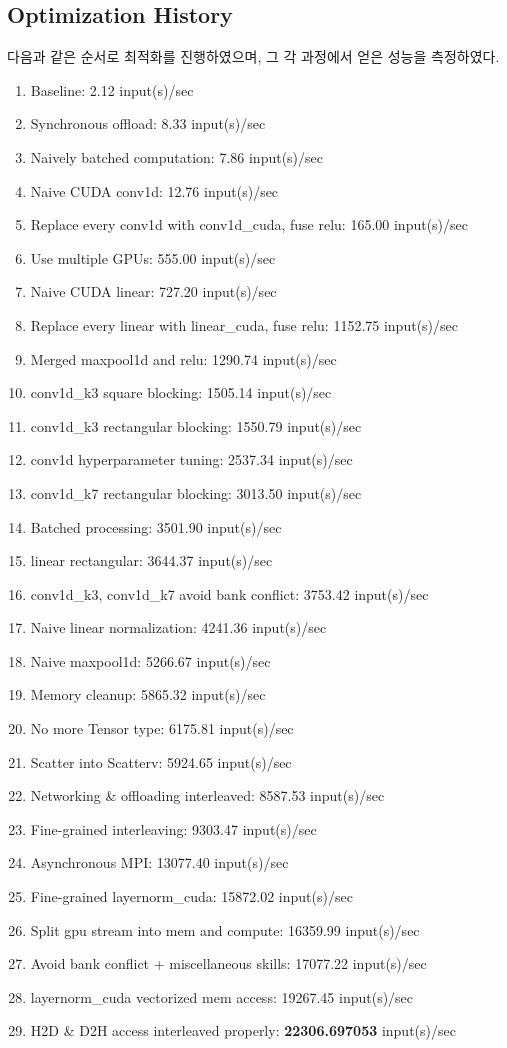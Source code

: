 \subsection{Optimization History}

다음과 같은 순서로 최적화를 진행하였으며, 그 각 과정에서 얻은 성능을 측정하였다.

\begin{enumerate}
    \item Baseline: 2.12 input(s)/sec
    \item Synchronous offload: 8.33 input(s)/sec
    \item Naively batched computation: 7.86 input(s)/sec
    \item Naive CUDA conv1d: 12.76 input(s)/sec
    \item Replace every conv1d with conv1d\_cuda, fuse relu: 165.00 input(s)/sec
    \item Use multiple GPUs: 555.00 input(s)/sec
    \item Naive CUDA linear: 727.20 input(s)/sec
    \item Replace every linear with linear\_cuda, fuse relu: 1152.75 input(s)/sec
    \item Merged maxpool1d and relu: 1290.74 input(s)/sec
    \item conv1d\_k3 square blocking: 1505.14 input(s)/sec
    \item conv1d\_k3 rectangular blocking: 1550.79 input(s)/sec
    \item conv1d hyperparameter tuning: 2537.34 input(s)/sec
    \item conv1d\_k7 rectangular blocking: 3013.50 input(s)/sec
    \item Batched processing: 3501.90 input(s)/sec
    \item linear rectangular: 3644.37 input(s)/sec
    \item conv1d\_k3, conv1d\_k7 avoid bank conflict: 3753.42 input(s)/sec
    \item Naive linear normalization: 4241.36 input(s)/sec
    \item Naive maxpool1d: 5266.67 input(s)/sec
    \item Memory cleanup: 5865.32 input(s)/sec
    \item No more Tensor type: 6175.81 input(s)/sec
    \item Scatter into Scatterv: 5924.65 input(s)/sec
    \item Networking \& offloading interleaved: 8587.53 input(s)/sec
    \item Fine-grained interleaving: 9303.47 input(s)/sec
    \item Asynchronous MPI: 13077.40 input(s)/sec
    \item Fine-grained layernorm\_cuda: 15872.02 input(s)/sec
    \item Split gpu stream into mem and compute: 16359.99 input(s)/sec
    \item Avoid bank conflict + miscellaneous skills: 17077.22 input(s)/sec
    \item layernorm\_cuda vectorized mem access: 19267.45 input(s)/sec
    \item H2D \& D2H access interleaved properly: \textbf{22306.697053} input(s)/sec
\end{enumerate}
